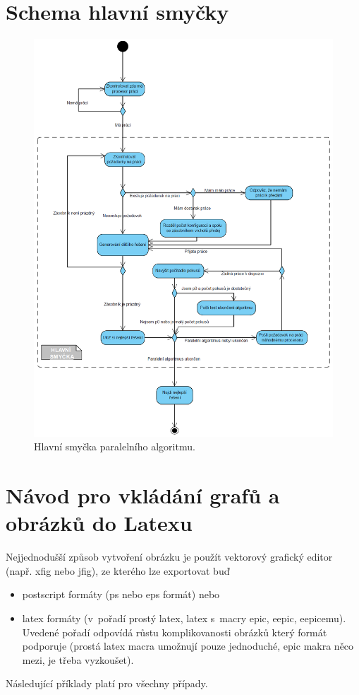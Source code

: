 \documentclass[12pt]{article}
\begin{document}

\appendix

\section{Schema hlavní smyčky}

\begin{figure}[ht]
\centering       
\includegraphics[scale=0.5]{while.jpg}
\caption{Hlavní smyčka paralelního algoritmu.}
\label{hlavniSmycka}
\end{figure}

\section{Návod pro vkládání grafů a obrázků do Latexu}

Nejjednodušší způsob vytvoření obrázku je použít vektorový grafický
editor (např. xfig nebo jfig), ze kterého lze exportovat buď
\begin{itemize}
\item postscript formáty (ps nebo eps formát) nebo
\item latex formáty (v~pořadí prostý latex, latex s~macry epic, eepic, eepicemu). Uvedené pořadí odpovídá růstu
komplikovanosti obrázků který formát podporuje (prostá latex macra
umožnují pouze jednoduché, epic makra něco mezi, je třeba
vyzkoušet).

\end{itemize}
Následující příklady platí pro všechny případy.
\end{document}
